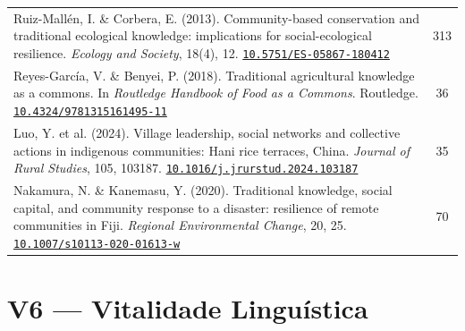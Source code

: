 \documentclass[a4paper,11pt]{article}
\newcommand{\doi}[1]{\href{https://doi.org/#1}{\texttt{#1}}}
\begin{document}
\begin{longtable}{>{\raggedright\arraybackslash}p{} c}
Ruiz-Mallén, I. \& Corbera, E. (2013). Community-based conservation and traditional ecological knowledge: implications for social-ecological resilience. \textit{Ecology and Society}, 18(4), 12.\newline
\doi{10.5751/ES-05867-180412} & 313 \\
\addlinespace

Reyes-García, V. \& Benyei, P. (2018). Traditional agricultural knowledge as a commons. In \textit{Routledge Handbook of Food as a Commons}. Routledge.\newline
\doi{10.4324/9781315161495-11} & 36 \\
\addlinespace

Luo, Y. et al. (2024). Village leadership, social networks and collective actions in indigenous communities: Hani rice terraces, China. \textit{Journal of Rural Studies}, 105, 103187.\newline
\doi{10.1016/j.jrurstud.2024.103187} & 35 \\
\addlinespace

Nakamura, N. \& Kanemasu, Y. (2020). Traditional knowledge, social capital, and community response to a disaster: resilience of remote communities in Fiji. \textit{Regional Environmental Change}, 20, 25.\newline
\doi{10.1007/s10113-020-01613-w} & 70 \\

\bottomrule
\end{longtable}

\section{V6 --- Vitalidade Linguística}
\end{document}
